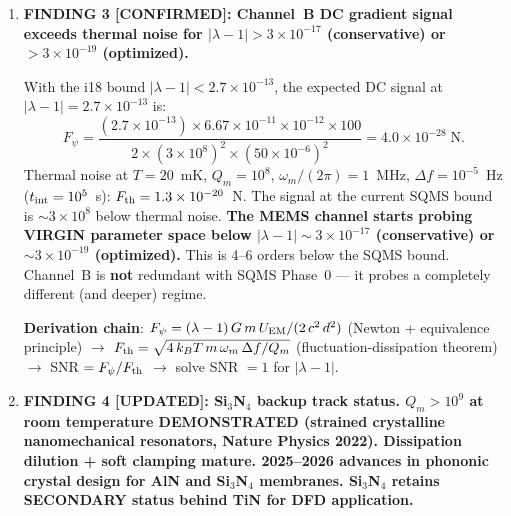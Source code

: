 \documentclass[11pt]{article}
\newcommand{\ee}[1]{\times 10^{#1}}
\newcommand{\lbone}{|\lambda - 1|}
\theoremstyle{definition}
\theoremstyle{remark}
\begin{document}
\begin{tcolorbox}[colback=blue!5!white, colframe=blue!60!black,
  title=\textbf{W4i19 P11: EM COUPLING / DETECTION --- 5 KEY RESULTS},
  breakable]
\begin{enumerate}
  \textbf{Derivation chain}: DC force equation (i18 Eq.~F4a)
  $\to$ thermal noise (i18 Eq.~F4b) $\to$ TiN $Q_m = 8\ee{6}$
  (Habermehl et al.\ 2025, arXiv:2509.02987) $\to$ PnC target
  $Q_m > 10^9$ (bandgap isolation, 100$\times$ improvement inside
  bandgap demonstrated) $\to$ kinetic inductance transduction
  (arXiv:2509.14133, 394~pH/$\square$).

\item \textbf{FINDING 3 [CONFIRMED]: Channel~B DC gradient signal
  exceeds thermal noise for $\lbone > 3\ee{-17}$ (conservative)
  or $> 3\ee{-19}$ (optimized).}

  With the i18 bound $\lbone < 2.7\ee{-13}$, the expected DC signal
  at $\lbone = 2.7\ee{-13}$ is:
  \[
  F_\psi = \frac{(2.7\ee{-13})\times 6.67\ee{-11}\times 10^{-12}
  \times 100}{2\times(3\ee{8})^2\times(50\ee{-6})^2}
  = 4.0\ee{-28}\;\text{N}.
  \]
  Thermal noise at $T=20$~mK, $Q_m = 10^8$, $\omega_m/(2\pi) = 1$~MHz,
  $\Delta f = 10^{-5}$~Hz ($t_{\rm int} = 10^5$~s):
  $F_{\rm th} = 1.3\ee{-20}$~N. The signal at the current SQMS bound
  is $\sim 3\ee{8}$ below thermal noise. \textbf{The MEMS channel
  starts probing VIRGIN parameter space below $\lbone \sim 3\ee{-17}$
  (conservative) or $\sim 3\ee{-19}$ (optimized).} This is 4--6
  orders below the SQMS bound. Channel~B is \textbf{not} redundant
  with SQMS Phase~0 --- it probes a completely different (and deeper)
  regime.

  \textbf{Derivation chain}: $F_\psi = (\lambda-1)\,G\,m\,U_{\rm EM}/
  (2\,c^2\,d^2)$ (Newton + equivalence principle) $\to$
  $F_{\rm th} = \sqrt{4\,k_B T\,m\,\omega_m\,\Delta f/Q_m}$
  (fluctuation-dissipation theorem) $\to$ SNR $= F_\psi/F_{\rm th}$
  $\to$ solve SNR $= 1$ for $\lbone$.

\item \textbf{FINDING 4 [UPDATED]: Si$_3$N$_4$ backup track status.
  $Q_m > 10^9$ at room temperature DEMONSTRATED (strained crystalline
  nanomechanical resonators, Nature Physics 2022). Dissipation
  dilution + soft clamping mature. 2025--2026 advances in phononic
  crystal design for AlN and Si$_3$N$_4$ membranes. Si$_3$N$_4$
  retains SECONDARY status behind TiN for DFD application.}


\end{enumerate}
\end{tcolorbox}
\end{document}
